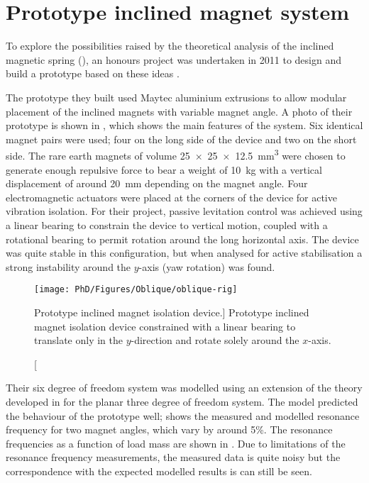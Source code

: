 \documentclass[11pt,a4paper]{memoir}
\begin{document}
\section{Prototype inclined magnet system}

To explore the possibilities raised by the theoretical analysis of the inclined magnetic spring (), an honours project was undertaken in 2011 to design and build a prototype based on these ideas \cite{frizenschaf2011-honoursthesis}.

The prototype they built used Maytec  aluminium extrusions to allow modular placement of the inclined magnets with variable magnet angle.
A photo of their prototype is shown in , which shows the main features of the system.
Six identical magnet pairs were used; four on the long side of the device and two on the short side.
The rare earth magnets of volume \SI{25x25x12.5}{mm^3} were chosen to generate enough repulsive force to bear a weight of \SI{10}{kg} with a vertical displacement of around \SI{20}{mm} depending on the magnet angle.
Four electromagnetic actuators were placed at the corners of the device for active vibration isolation.
For their project, passive levitation control was achieved using a linear bearing to constrain the device to vertical motion, coupled with a rotational bearing to permit rotation around the long horizontal axis.
The device was quite stable in this configuration, but when analysed for active stabilisation a strong instability around the $y$-axis (yaw rotation) was found.

\begin{figure}
\begin{wide}
\texttt{[image: PhD/Figures/Oblique/oblique-rig]}
\end{wide}
\caption
[Prototype inclined magnet isolation device.]
{Prototype inclined magnet isolation device constrained with a linear bearing to translate only in the $y$-direction and rotate solely around the $x$-axis.}
\end{figure}

Their six degree of freedom system was modelled using an extension of the theory developed in  for the planar three degree of freedom system.
The model predicted the behaviour of the prototype well;  shows the measured and modelled resonance frequency for two magnet angles, which vary by around 5\%.
The resonance frequencies as a function of load mass are shown in .
Due to limitations of the resonance frequency measurements, the measured data is quite noisy but the correspondence with the expected modelled results is can still be seen.
\end{document}
